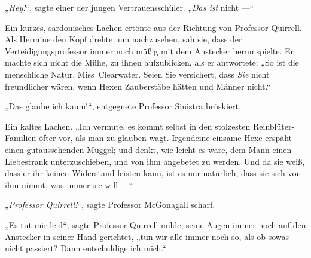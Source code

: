 „\emph{Hey!}“, sagte einer der jungen Vertrauensschüler.
„\emph{Das ist} nicht —“

Ein kurzes, sardonisches Lachen ertönte aus der Richtung von Professor Quirrell. Als Hermine den Kopf drehte, um nachzusehen, sah sie, dass der Verteidigungsprofessor immer noch müßig mit dem Anstecker herumspielte. Er machte sich nicht die Mühe, zu ihnen aufzublicken, als er antwortete:
„So ist die menschliche Natur, Miss~Clearwater. Seien Sie versichert, dass \emph{Sie} nicht freundlicher wären, wenn Hexen Zauberstäbe hätten und Männer nicht.“

„Das glaube ich kaum!“, entgegnete Professor Sinistra brüskiert.

Ein kaltes Lachen.
„Ich vermute, es kommt selbst in den stolzesten Reinblüter-Familien öfter vor, als man zu glauben wagt. Irgendeine einsame Hexe erspäht einen gutaussehenden Muggel; und denkt, wie leicht es wäre, dem Mann einen Liebestrank unterzuschieben, und von ihm angebetet zu werden. Und da sie weiß, dass er ihr keinen Widerstand leisten kann, ist es nur natürlich, dass sie sich von ihm nimmt, was immer sie will —“

„\emph{Professor Quirrell!}“, sagte Professor McGonagall scharf.

„Es tut mir leid“, sagte Professor Quirrell milde, seine Augen immer noch auf den Anstecker in seiner Hand gerichtet, „tun wir alle immer noch so, als ob sowas nicht passiert? Dann entschuldige ich mich.“

